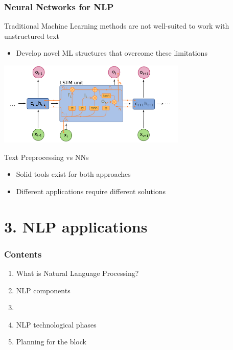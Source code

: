 \documentclass{beamer}
\begin{document}
\begin{frame}

	\frametitle{Neural Networks for NLP}

    Traditional Machine Learning methods are not well-suited to work with unstructured text
    \begin{itemize}
        \item Develop novel ML structures that overcome these limitations
	\end{itemize}
    \centerline{\includegraphics[width=9cm]{./figs/LSTM.png}}
    
    \footnotesize
	\begin{block}{Text Preprocessing vs NNs}
	\begin{itemize}
	
		\item Solid tools exist for both approaches
		\item Different applications require different solutions
	
	\end{itemize}
	\end{block}
	
\end{frame}

\section{3. NLP applications}

\begin{frame}

    \frametitle{Contents}

	\large

    \begin{enumerate}
  
    	\item What is Natural Language Processing?
    	\item NLP components
    	\item {\bf \color{blue}{NLP applications}}
    	\item NLP technological phases
    	\item Planning for the block
    
    \end{enumerate}

\end{frame}
\end{document}
